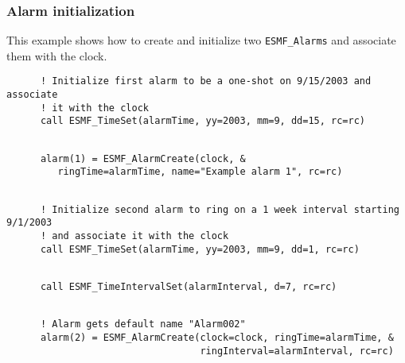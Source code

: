 
  \subsubsection{Alarm initialization}
 
   This example shows how to create and initialize two {\tt ESMF\_Alarms} and
   associate them with the clock. 

 \begin{verbatim}
      ! Initialize first alarm to be a one-shot on 9/15/2003 and associate
      ! it with the clock
      call ESMF_TimeSet(alarmTime, yy=2003, mm=9, dd=15, rc=rc)
 
\end{verbatim}
 

 \begin{verbatim}
      alarm(1) = ESMF_AlarmCreate(clock, &
         ringTime=alarmTime, name="Example alarm 1", rc=rc)
 
\end{verbatim}
 

 \begin{verbatim}
      ! Initialize second alarm to ring on a 1 week interval starting 9/1/2003
      ! and associate it with the clock
      call ESMF_TimeSet(alarmTime, yy=2003, mm=9, dd=1, rc=rc)
 
\end{verbatim}
 

 \begin{verbatim}
      call ESMF_TimeIntervalSet(alarmInterval, d=7, rc=rc)
 
\end{verbatim}
 

 \begin{verbatim}
      ! Alarm gets default name "Alarm002"
      alarm(2) = ESMF_AlarmCreate(clock=clock, ringTime=alarmTime, &
                                  ringInterval=alarmInterval, rc=rc)
 
\end{verbatim}
 
